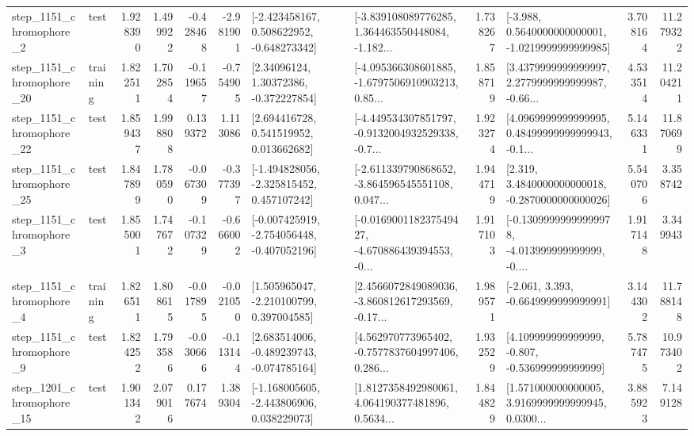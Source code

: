\begin{tabular}{llrrrrllrlrr}
  step\_1151\_chromophore\_2 &      test &      1.928390 &    1.499922 &     -0.428468 & -2.981901 &   [-2.423458167, 0.508622952, -0.648273342] &  [-3.839108089776285, 1.364463550448084, -1.182... &       1.738267 &  [-3.988, 0.5640000000000001, -1.0219999999999985] &            3.708164 &         11.279322 \\
 step\_1151\_chromophore\_20 &  training &      1.822511 &    1.702854 &     -0.119657 & -0.754905 &      [2.34096124, 1.30372386, -0.372227854] &  [-4.095366308601885, -1.6797506910903213, 0.85... &       1.858719 &  [3.4379999999999997, 2.2779999999999987, -0.66... &            4.533514 &         11.204211 \\
 step\_1151\_chromophore\_22 &      test &      1.859437 &    1.998808 &      0.139372 &  1.113086 &     [2.694416728, 0.541519952, 0.013662682] &  [-4.449534307851797, -0.9132004932529338, -0.7... &       1.923274 &  [4.0969999999999995, 0.48499999999999943, -0.1... &            5.146331 &         11.870699 \\
 step\_1151\_chromophore\_25 &      test &      1.847899 &    1.780590 &     -0.067309 & -0.377397 &   [-1.494828056, -2.325815452, 0.457107242] &  [-2.611339790868652, -3.864596545551108, 0.047... &       1.944719 &   [2.319, 3.4840000000000018, -0.2870000000000026] &            5.540706 &          3.358742 \\
  step\_1151\_chromophore\_3 &      test &      1.855001 &    1.747672 &     -0.107329 & -0.666002 &  [-0.007425919, -2.754056448, -0.407052196] &  [-0.016900118237549427, -4.670886439394553, -0... &       1.917103 &  [-0.13099999999999978, -4.013999999999999, -0.... &            1.917148 &          3.349943 \\
  step\_1151\_chromophore\_4 &  training &      1.826511 &    1.808615 &     -0.017895 & -0.021050 &    [1.505965047, -2.210100799, 0.397004585] &  [2.4566072849089036, -3.860812617293569, -0.17... &       1.989571 &               [-2.061, 3.393, -0.6649999999999991] &            3.144302 &         11.788148 \\
  step\_1151\_chromophore\_9 &      test &      1.824252 &    1.793586 &     -0.030666 & -0.113144 &   [2.683514006, -0.489239743, -0.074785164] &  [4.562970773965402, -0.7577837604997406, 0.286... &       1.932529 &    [4.109999999999999, -0.807, -0.536999999999999] &            5.787475 &         10.973402 \\
 step\_1201\_chromophore\_15 &      test &      1.901342 &    2.079016 &      0.177674 &  1.389304 &   [-1.168005605, -2.443806906, 0.038229073] &  [1.8127358492980061, 4.064190377481896, 0.5634... &       1.844829 &  [1.571000000000005, 3.9169999999999945, 0.0300... &            3.885923 &          7.149128 \\

\end{tabular}
